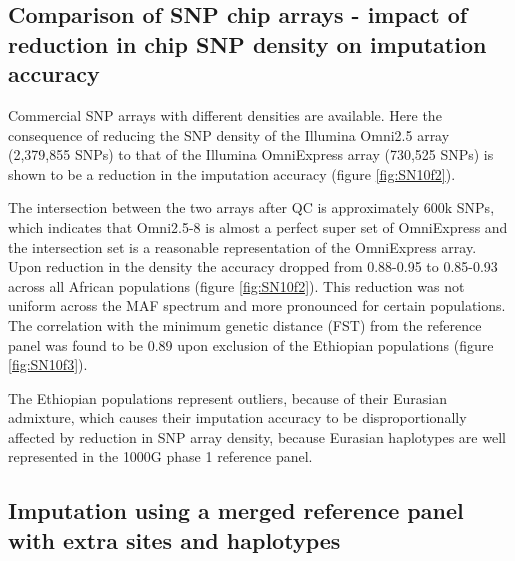 \subsection{Comparison of SNP chip arrays - impact of reduction in chip SNP density on imputation accuracy}
\label{subsec:thinning}
Commercial \gls{SNP} arrays with different densities are available. Here the consequence of reducing the \gls{SNP} density of the Illumina Omni2.5 array (2,379,855 SNPs) to that of the Illumina OmniExpress array (730,525 SNPs) is shown to be a reduction in the imputation accuracy (figure \ref{fig:SN10f2}).

The intersection between the two arrays after \gls{QC} is approximately 600k \glspl{SNP}, which indicates that Omni2.5-8 is almost a perfect super set of OmniExpress and the intersection set is a reasonable representation of the OmniExpress array. Upon reduction in the density the accuracy dropped from 0.88-0.95 to 0.85-0.93 across all African populations (figure \ref{fig:SN10f2}). This reduction was not uniform across the \gls{MAF} spectrum and more pronounced for certain populations. The correlation with the minimum genetic distance (\gls{FST}) from the reference panel was found to be 0.89 upon exclusion of the Ethiopian populations (figure \ref{fig:SN10f3}).

The Ethiopian populations represent outliers, because of their Eurasian admixture, which causes their imputation accuracy to be disproportionally affected by reduction in \gls{SNP} array density, because Eurasian haplotypes are well represented in the \gls{1000G} phase 1 reference panel.\cite{1000G2012}


\subsection{Imputation using a merged reference panel with extra sites and haplotypes}

